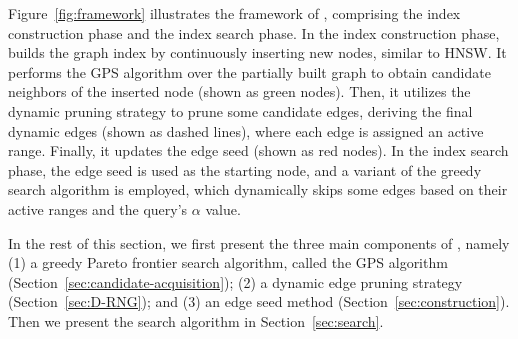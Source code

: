Figure~\ref{fig:framework} illustrates the framework of \method, comprising the index construction phase and the index search phase. In the index construction phase, \method builds the graph index by continuously inserting new nodes, similar to HNSW. It performs the GPS algorithm over the partially built graph to obtain candidate neighbors of the inserted node (shown as green nodes). Then, it utilizes the dynamic pruning strategy to prune some candidate edges, deriving the final dynamic edges (shown as dashed lines), where each edge is assigned an active range. Finally, it updates the edge seed (shown as red nodes). In the index search phase, the edge seed is used as the starting node, and a variant of the greedy search algorithm is employed, which dynamically skips some edges based on their active ranges and the query's $\alpha$ value. %

In the rest of this section, we first present the three main components of \method, namely (1) a greedy Pareto frontier search algorithm, called the GPS algorithm (Section~\ref{sec:candidate-acquisition}); (2) a dynamic edge pruning strategy (Section~\ref{sec:D-RNG}); and (3) an edge seed method (Section~\ref{sec:construction}). Then we present the search algorithm in Section~\ref{sec:search}.






